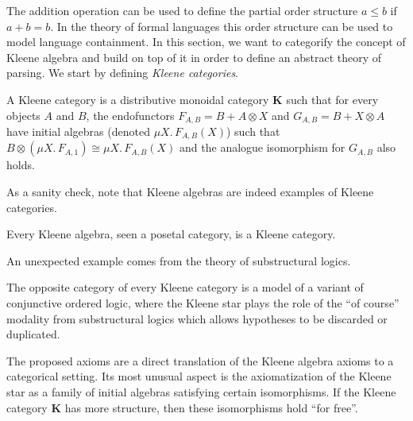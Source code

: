 \documentclass[sigconf,anonymous,review,screen]{acmart}
\newcommand{\cat}[1]{\mathbf{#1}}
\newif\ifdraft
\newcommand{\steven}[1]{\ifdraft{\color{orange}[{\bf Steven}: #1]}\fi}
\begin{document}
The addition operation can be used to define the partial order
structure $a \leq b$ if $a + b = b$. In the theory of formal languages
this order structure can be used to model language containment. In this
section, we want to categorify the concept of Kleene algebra and
build on top of it in order to define an abstract theory of parsing.
We start by defining \emph{Kleene categories}.

\begin{definition}
  A Kleene category is a distributive monoidal category $\cat{K}$
  such that for every objects $A$ and $B$, the endofunctors $F_{A, B}
  = B + A \otimes X$ and $G_{A, B} = B + X \otimes A$ have initial
  algebras (denoted $\mu X.\, F_{A, B}(X)$) such that $B \otimes (\mu
  X.\, F_{A, 1}) \cong \mu X.\, F_{A, B}(X)$ and the analogue isomorphism
  for $G_{A,B}$ also holds.
\end{definition}

As a sanity check, note that Kleene algebras are indeed examples of
Kleene categories.

\begin{example}
  Every Kleene algebra, seen a posetal category, is a Kleene category.
\end{example}

An unexpected example comes from the theory of substructural logics.

\begin{example}
  The opposite category of every Kleene category is a model of a variant of
  conjunctive ordered logic, where the Kleene star plays the role of the ``of
  course'' modality from substructural logics which allows hypotheses to
  be discarded or duplicated.
\end{example}

\steven{What is the ``of course'' modality? Is this ``$!$'' in linear logic?}

The proposed axioms are a direct translation of the Kleene algebra
axioms to a categorical setting. Its most unusual aspect is the
axiomatization of the Kleene star as a family of initial algebras
satisfying certain isomorphisms. If the Kleene category $\cat{K}$ has
more structure, then these isomorphisms hold ``for free''.
\end{document}
